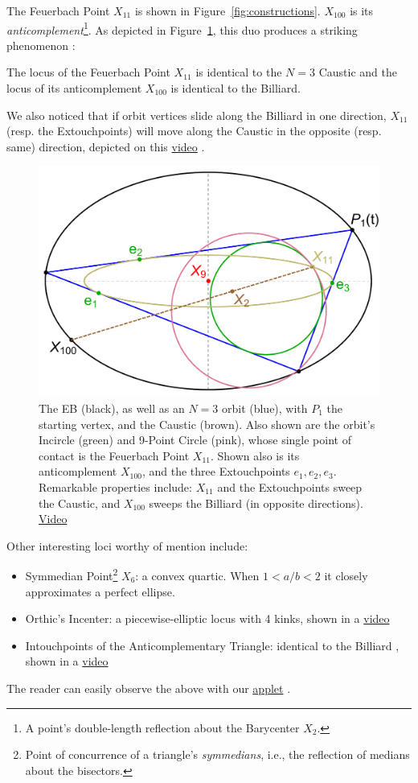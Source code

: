 The Feuerbach Point $X_{11}$  is shown in Figure~\ref{fig:constructions}. $X_{100}$ is its {\em anticomplement}\footnote{A point's double-length reflection about the Barycenter $X_2$.}. As depicted in Figure~\ref{fig:feuer_loci}, 
this duo produces 
a striking phenomenon \cite{reznik2020-loci}:

\begin{theorem}
The locus of the Feuerbach Point $X_{11}$ is identical to the $N=3$ Caustic and the locus of its anticomplement $X_{100}$ is identical to the Billiard.
\end{theorem}

We also noticed that if orbit vertices slide along the Billiard in one direction, $X_{11}$ (resp. the Extouchpoints) will move along the Caustic in the opposite (resp. same) direction, depicted on this \href{https://youtu.be/TXdg7tUl8lc}{video} \cite[pl\#10]{dsr_math_intell_playlist}.

\begin{figure}[H]
    \centering
    \includegraphics[width=.60\textwidth]{pics/u0035_feuerbach_loci.pdf}
    \caption{The EB (black), as well as an $N=3$ orbit (blue), with $P_1$ the starting vertex, and the Caustic (brown). Also shown are the orbit's Incircle (green) and 9-Point Circle (pink), whose single point of contact is the Feuerbach Point $X_{11}$. Shown also is its anticomplement $X_{100}$, and the three Extouchpoints $e_1,e_2,e_3$. Remarkable properties include: $X_{11}$ and the Extouchpoints sweep the Caustic, and $X_{100}$ sweeps the Billiard (in opposite directions).
    \href{https://youtu.be/TXdg7tUl8lc}{Video} \cite[pl\#12]{dsr_math_intell_playlist}}
    \label{fig:feuer_loci}
\end{figure}

\noindent Other interesting loci worthy of mention include:

\begin{itemize}
    \item Symmedian Point\footnote{Point of concurrence of a triangle's {\em symmedians}, i.e., the reflection of medians about the bisectors.} $X_6$: a convex quartic. When $1<a/b<2$ it closely approximates a perfect ellipse.
    \item Orthic's Incenter: a piecewise-elliptic locus with 4 kinks, shown in a  \href{https://youtu.be/3qJnwpFkUFQ}{video} \cite[pl\#11]{dsr_math_intell_playlist}
    \item Intouchpoints of the Anticomplementary Triangle: identical to the Billiard \cite{minevich17}, shown in a \href{https://youtu.be/50dyxWJhfN4}{video} \cite[pl\#12]{dsr_math_intell_playlist} 
\end{itemize}

\noindent The reader can easily observe the above with our \href{https://editor.p5js.org/undefined/present/i1Lin7lt7}{applet} \cite{dsr_applet_x12345}. 